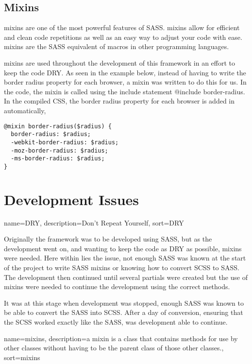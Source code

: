 \subsection*{Mixins}
\gls{mixins} are one of the most powerful features of \gls{SASS}. \gls{mixins} allow for efficient and clean code repetitions as well as an easy way to adjust your code with ease. \gls{mixins} are the \gls{SASS} equivalent of macros in other programming languages.

\gls{mixins} are used throughout the development of this framework in an effort to keep the code DRY. As seen in the example below, instead of having to write the border radius property for each browser, a mixin was written to do this for us. In the code, the mixin is called using the include statement @include border-radius. In the compiled CSS, the border radius property for each browser is added in automatically, 

\begin{lstlisting}[language=CSS3]
@mixin border-radius($radius) {
  border-radius: $radius;
  -webkit-border-radius: $radius;
  -moz-border-radius: $radius;
  -ms-border-radius: $radius;
}
\end{lstlisting}

\newpage
\section*{Development Issues}

{
  name={DRY},
  description={Don't Repeat Yourself},
  sort=DRY
}

Originally the framework was to be developed using \gls{SASS}, but as the development went on, and wanting to keep the code as \gls{DRY} as possible, \gls{mixins} were needed. Here within lies the issue, not enough \gls{SASS} was known at the start of the project to write \gls{SASS} \gls{mixins} or knowing how to convert \gls{SCSS} to \gls{SASS}. The development then continued until several partials were created but the use of \gls{mixins} were needed to continue the development using the correct methods. 

It was at this stage when development was stopped, enough \gls{SASS} was known to be able to convert the \gls{SASS} into \gls{SCSS}. After a day of conversion, ensuring that the \gls{SCSS} worked exactly like the \gls{SASS}, was development able to continue. 

{
  name={mixins},
  description={a mixin is a class that contains methods for use by other classes without having to be the parent class of those other classes.},
  sort=mixins
}

